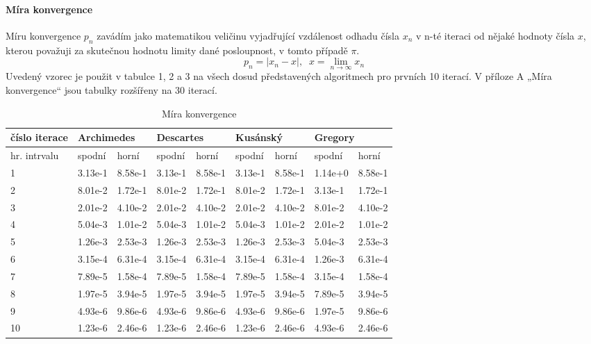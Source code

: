 \documentclass[soc]{gzwroc} %
\begin{document}
\paragraph{Míra konvergence}
Míru konvergence $p_n$ zavádím jako matematikou veličinu vyjadřující vzdálenost odhadu čísla $x_n$ v n-té iteraci od nějaké hodnoty čísla $x$, kterou považuji za skutečnou hodnotu limity dané posloupnost, v tomto případě $\pi$.
$$
p_n=|x_n-x|, \;\; x=\lim_{n\to\infty} x_n
$$
Uvedený vzorec je použit v tabulce 1, 2 a 3 na všech dosud představených algoritmech pro prvních 10 iterací. V příloze A „Míra konvergence“ jsou tabulky rozšířeny na 30 iterací.
\begin{table}[h!]
\caption{Míra konvergence}
\begin{tabular}{|l|l|l|l|l|l|l|l|l|}
\hline
\multicolumn{1}{|l|}{\bfseries číslo iterace} & \multicolumn{2}{l|}{\bfseries Archimedes} & \multicolumn{2}{l|}{\bfseries Descartes} & \multicolumn{2}{l|}{\bfseries Kusánský} & \multicolumn{2}{l|}{\bfseries Gregory}  \\ \hline
\multicolumn{1}{|l|}{hr. intrvalu} & \multicolumn{1}{l|}{spodní} & \multicolumn{1}{l|}{horní} & \multicolumn{1}{l|}{spodní} & \multicolumn{1}{l|}{horní} & \multicolumn{1}{l|}{spodní} & \multicolumn{1}{l|}{horní} & \multicolumn{1}{l|}{spodní} & \multicolumn{1}{l|}{horní} \\ \hline \hline
1 & 3.13e-1 & 8.58e-1 & 3.13e-1 & 8.58e-1 & 3.13e-1 & 8.58e-1 & 1.14e+0 & 8.58e-1 \\ \hline 
2 & 8.01e-2 & 1.72e-1 & 8.01e-2 & 1.72e-1 & 8.01e-2 & 1.72e-1 & 3.13e-1 & 1.72e-1 \\ \hline 
3 & 2.01e-2 & 4.10e-2 & 2.01e-2 & 4.10e-2 & 2.01e-2 & 4.10e-2 & 8.01e-2 & 4.10e-2 \\ \hline 
4 & 5.04e-3 & 1.01e-2 & 5.04e-3 & 1.01e-2 & 5.04e-3 & 1.01e-2 & 2.01e-2 & 1.01e-2 \\ \hline 
5 & 1.26e-3 & 2.53e-3 & 1.26e-3 & 2.53e-3 & 1.26e-3 & 2.53e-3 & 5.04e-3 & 2.53e-3 \\ \hline 
6 & 3.15e-4 & 6.31e-4 & 3.15e-4 & 6.31e-4 & 3.15e-4 & 6.31e-4 & 1.26e-3 & 6.31e-4 \\ \hline 
7 & 7.89e-5 & 1.58e-4 & 7.89e-5 & 1.58e-4 & 7.89e-5 & 1.58e-4 & 3.15e-4 & 1.58e-4 \\ \hline 
8 & 1.97e-5 & 3.94e-5 & 1.97e-5 & 3.94e-5 & 1.97e-5 & 3.94e-5 & 7.89e-5 & 3.94e-5 \\ \hline 
9 & 4.93e-6 & 9.86e-6 & 4.93e-6 & 9.86e-6 & 4.93e-6 & 9.86e-6 & 1.97e-5 & 9.86e-6 \\ \hline 
10 & 1.23e-6 & 2.46e-6 & 1.23e-6 & 2.46e-6 & 1.23e-6 & 2.46e-6 & 4.93e-6 & 2.46e-6 \\ \hline  
\end{tabular}
\end{table}
\end{document}
